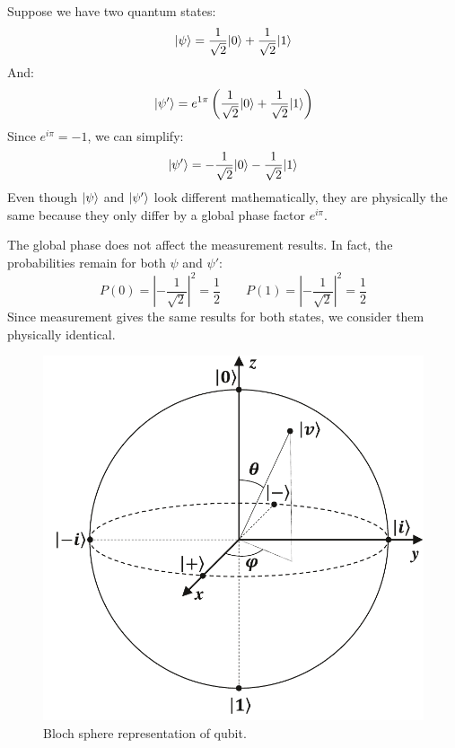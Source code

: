 \begin{examplebox}
    Suppose we have two quantum states:
    \begin{equation*}
        | \psi \rangle = \dfrac{1}{\sqrt{2}}| 0 \rangle + \dfrac{1}{\sqrt{2}}| 1 \rangle
    \end{equation*}
    And:
    \begin{equation*}
        | \psi' \rangle = e^{1\pi} \left(\dfrac{1}{\sqrt{2}}| 0 \rangle + \dfrac{1}{\sqrt{2}}| 1 \rangle\right)
    \end{equation*}
    Since $e^{i\pi} = -1$, we can simplify:
    \begin{equation*}
        | \psi' \rangle = -\dfrac{1}{\sqrt{2}}| 0 \rangle -\dfrac{1}{\sqrt{2}}| 1 \rangle
    \end{equation*}
    Even though $| \psi \rangle$ and $| \psi' \rangle$ look different mathematically, they are physically the same because they only differ by a global phase factor $e^{i\pi}$.

    The global phase does not affect the measurement results. In fact, the probabilities remain for both $\psi$ and $\psi'$:
    \begin{equation*}
        P\left(0\right) = \left|-\dfrac{1}{\sqrt{2}}\right|^{2} = \dfrac{1}{2}
        \hspace{2em}
        P\left(1\right) = \left|-\dfrac{1}{\sqrt{2}}\right|^{2} = \dfrac{1}{2}
    \end{equation*}
    Since measurement gives the same results for both states, we consider them physically identical.
\end{examplebox}

\begin{figure}[!htp]
    \centering
    \includegraphics[width=.7\textwidth]{img/bloch-sphere-qubit-1.pdf}
    \caption{Bloch sphere representation of qubit.}
    \label{fig: Bloch sphere representation of qubit}
\end{figure}